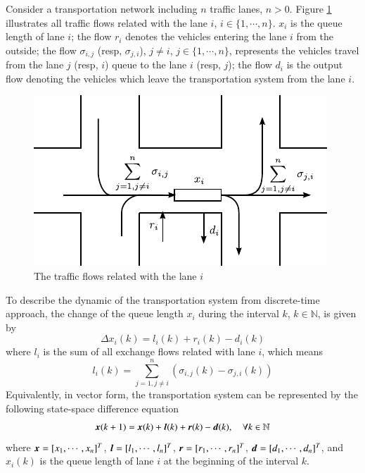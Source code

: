 \documentclass[preprint,authoryear,12pt]{elsarticle}
\renewcommand{\vec}[1]{\mbox{\boldmath$#1$}}
\begin{document}
Consider a transportation network including $n$ traffic lanes, $n>0$. Figure \ref{fig:flows} illustrates all traffic flows related with the lane $i$, $i\in\{1,\cdots,n\}$. $x_i$ is the queue length of lane $i$; the flow $r_i$ denotes the vehicles entering the lane $i$ from the outside; the flow $\sigma_{i,j}$ (resp, $\sigma_{j,i}$), $j\neq i$, $j\in\{1,\cdots,n\}$, represents the vehicles travel from the lane $j$ (resp, $i$) queue to the lane $i$ (resp, $j$); the flow $d_{i}$ is the output flow denoting the vehicles which leave the transportation system from the lane $i$.

\begin{figure}[ht]
  \centering
  \includegraphics{pics/flows}
  \caption{The traffic flows related with the lane $i$}
  \label{fig:flows}
\end{figure}

To describe the dynamic of the transportation system from discrete-time approach, the change of the queue length $x_i$ during the interval $k$, $k\in\mathbb{N}$, is given by
\begin{equation}\label{equ:mdl_gnl_lane}
\Delta x_i(k) = l_i(k)+r_i(k)-d_i(k)
\end{equation}
where $l_i$ is the sum of all exchange flows related with lane $i$, which means
$$l_i(k)=\sum_{j=1,j\neq i}^{n}(\sigma_{i,j}(k)-\sigma_{j,i}(k))$$
Equivalently, in vector form, the transportation system can be represented by the following state-space difference equation
\begin{equation}\label{equ:mdl_gnl}
\vec{x}(k+1)=\vec{x}(k)+\vec{l}(k)+\vec{r}(k)-\vec{d}(k),\quad \forall k\in\mathbb{N}
\end{equation}
where $\vec{x}=[x_1,\cdots,x_n]^T$, $\vec{l}=[l_1,\cdots,l_n]^T$, $\vec{r}=[r_1,\cdots,r_n]^T$, $\vec{d}=[d_1,\cdots,d_n]^T$, and $x_i(k)$ is the queue length of lane $i$ at the beginning of the interval $k$.
\end{document}
